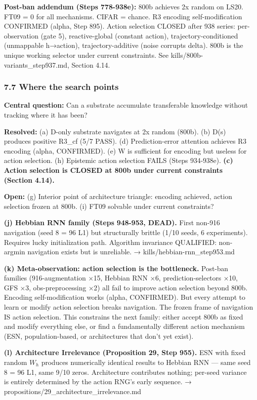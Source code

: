 \documentclass[
  11pt,
]{article}
\begin{document}
\textbf{Post-ban addendum (Steps 778-938e):} 800b achieves 2x random on
LS20. FT09 = 0 for all mechanisms. CIFAR = chance. R3 encoding
self-modification CONFIRMED (alpha, Step 895). Action selection CLOSED
after 938 series: per-observation (gate 5), reactive-global (constant
action), trajectory-conditioned (unmappable h→action),
trajectory-additive (noise corrupts delta). 800b is the unique working
selector under current constraints. See kills/800b-variants\_step937.md,
Section 4.14.

\subsubsection{7.7 Where the search
points}\label{where-the-search-points}

\textbf{Central question:} Can a substrate accumulate transferable
knowledge without tracking where it has been?

\textbf{Resolved:} (a) D-only substrate navigates at 2x random (800b).
(b) D(s) produces positive R3\_cf (5/7 PASS). (d) Prediction-error
attention achieves R3 encoding (alpha, CONFIRMED). (e) W is sufficient
for encoding but useless for action selection. (h) Epistemic action
selection FAILS (Steps 934-938e). \textbf{(c) Action selection is CLOSED
at 800b under current constraints (Section 4.14).}

\textbf{Open:} (g) Interior point of architecture triangle: encoding
achieved, action selection frozen at 800b. (i) FT09 solvable under
current constraints?

\textbf{(j) Hebbian RNN family (Steps 948-953, DEAD).} First non-916
navigation (seed 8 = 96 L1) but structurally brittle (1/10 seeds, 6
experiments). Requires lucky initialization path. Algorithm invariance
QUALIFIED: non-argmin navigation exists but is unreliable. →
kills/hebbian-rnn\_step953.md

\textbf{(k) Meta-observation: action selection is the bottleneck.}
Post-ban families (916-augmentation ×15, Hebbian RNN ×6,
prediction-selectors ×10, GFS ×3, obs-preprocessing ×2) all fail to
improve action selection beyond 800b. Encoding self-modification works
(alpha, CONFIRMED). But every attempt to learn or modify action
selection breaks navigation. The frozen frame of navigation IS action
selection. This constrains the next family: either accept 800b as fixed
and modify everything else, or find a fundamentally different action
mechanism (ESN, population-based, or architectures that don't yet
exist).

\textbf{(l) Architecture Irrelevance (Proposition 29, Step 955).} ESN
with fixed random \(W_h\) produces numerically identical results to
Hebbian RNN --- same seed 8 = 96 L1, same 9/10 zeros. Architecture
contributes nothing; per-seed variance is entirely determined by the
action RNG's early sequence. →
propositions/29\_architecture\_irrelevance.md
\end{document}
